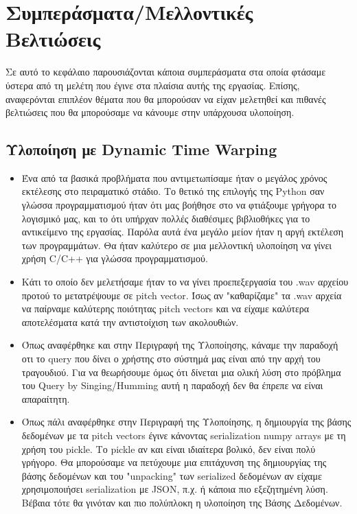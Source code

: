 \section{Συμπεράσματα/Μελλοντικές Βελτιώσεις}
Σε αυτό το κεφάλαιο παρουσιάζονται κάποια συμπεράσματα στα οποία φτάσαμε ύστερα από τη μελέτη που έγινε στα
πλαίσια αυτής της εργασίας. Επίσης, αναφερόνται επιπλέον θέματα που θα μπορούσαν να είχαν μελετηθεί 
και πιθανές βελτιώσεις που θα μπορούσαμε να κάνουμε στην υπάρχουσα υλοποίηση.

\subsection{Υλοποίηση με Dynamic Time Warping}
\begin{itemize}
  \item Ένα από τα βασικά προβλήματα που αντιμετωπίσαμε ήταν ο μεγάλος χρόνος εκτέλεσης στο πειραματικό
  στάδιο. Το θετικό της επιλογής της Python σαν γλώσσα προγραμματισμού ήταν ότι μας βοήθησε στο να φτιάξουμε γρήγορα το λογισμικό μας, και το ότι υπήρχαν πολλές διαθέσιμες βιβλιοθήκες για το αντικείμενο της εργασίας.
  Παρόλα αυτά ένα μεγάλο μείον ήταν η αργή εκτέλεση των προγραμμάτων. Θα ήταν καλύτερο σε μια μελλοντική υλοποίηση να γίνει χρήση C/C++ για γλώσσα προγραμματισμού.
  
  \item Κάτι το οποίο δεν μελετήσαμε ήταν το να γίνει προεπεξεργασία του .wav αρχείου προτού το μετατρέψουμε
  σε pitch vector. Ίσως αν "καθαρίζαμε" τα .wav αρχεία να παίρναμε καλύτερης ποιότητας pitch vectors και να 
  είχαμε καλύτερα αποτελέσματα κατά την αντιστοίχιση των ακολουθιών. 

  \item Όπως αναφέρθηκε και στην Περιγραφή της Υλοποίησης, κάναμε την παραδοχή οτι το query που δίνει ο χρήστης στο σύστημά μας είναι από την αρχή του τραγουδιού. Για να θεωρήσουμε όμως ότι δίνεται μια ολική 
  λύση στο πρόβλημα του Query by Singing/Humming αυτή η παραδοχή δεν θα έπρεπε να είναι απαραίτητη.

  \item Όπως πάλι αναφέρθηκε στην Περιγραφή της Υλοποίησης, η δημιουργία της βάσης δεδομένων με τα pitch
  vectors έγινε κάνοντας serialization numpy arrays με τη χρήση του pickle. Το pickle αν και είναι ιδιαίτερα 
  βολικό, δεν είναι πολύ γρήγορο. Θα μπορούσαμε να πετύχουμε μια επιτάχυνση της δημιουργίας της βάσης δεδομένων και του "unpacking" των serialized δεδομένων αν είχαμε χρησιμοποιήσει serialization με JSON, π.χ. \cite{tinydb} ή κάποια πιο εξεζητημένη λύση. Βέβαια τότε θα γινόταν και πιο πολύπλοκη η υλοποίηση της Βάσης Δεδομένων.


\end{itemize}
